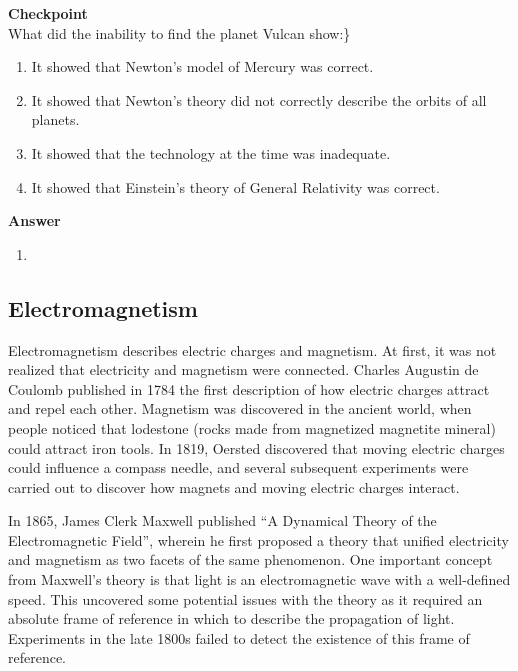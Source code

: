 \documentclass[9pt,Preprint]{lapreprint}
\begin{document}
\begin{framed}
\textbf{Checkpoint}\\
What did the inability to find the planet Vulcan show:\}

\begin{enumerate}
\item It showed that Newton's model of Mercury was correct.
\item It showed that Newton's theory did not correctly describe the orbits of all planets.
\item It showed that the technology at the time was inadequate.
\item It showed that Einstein's theory of General Relativity was correct.
\end{enumerate}

\begin{framed}
\textbf{Answer}\\
\begin{enumerate}[resume]
\item
\end{enumerate}
\end{framed}
\end{framed}

\subsection{Electromagnetism}

Electromagnetism describes electric charges and magnetism. At first, it was not realized that electricity and magnetism were connected. Charles Augustin de Coulomb published in 1784 the first description of how electric charges attract and repel each other. Magnetism was discovered in the ancient world, when people noticed that lodestone (rocks made from magnetized magnetite mineral) could attract iron tools. In 1819, Oersted discovered that moving electric charges could influence a compass needle, and several subsequent experiments were carried out to discover how magnets and moving electric charges interact.

In 1865, James Clerk Maxwell published ``A Dynamical Theory of the Electromagnetic Field'', wherein he first proposed a theory that unified electricity and magnetism as two facets of the same phenomenon. One important concept from Maxwell's theory is that light is an electromagnetic wave with a well-defined speed. This uncovered some potential issues with the theory as it required an absolute frame of reference in which to describe the propagation of light. Experiments in the late 1800s failed to detect the existence of this frame of reference.
\end{document}

